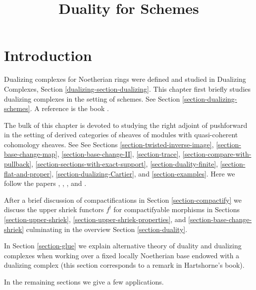 

%


\title{Duality for Schemes}


\maketitle

\label{section-phantom}

\tableofcontents

\section{Introduction}
\label{section-introduction}

\noindent
Dualizing complexes for Noetherian rings were defined and studied in
Dualizing Complexes, Section \ref{dualizing-section-dualizing}.
This chapter first briefly studies dualizing complexes in the
setting of schemes.
See Section \ref{section-dualizing-schemes}.
A reference is the book \cite{RD}.

\medskip\noindent
The bulk of this chapter is devoted to studying the right adjoint
of pushforward in the setting of derived categories of sheaves
of modules with quasi-coherent cohomology sheaves. See
See Sections
\ref{section-twisted-inverse-image},
\ref{section-base-change-map},
\ref{section-base-change-II},
\ref{section-trace},
\ref{section-compare-with-pullback},
\ref{section-sections-with-exact-support},
\ref{section-duality-finite},
\ref{section-flat-and-proper},
\ref{section-dualizing-Cartier}, and
\ref{section-examples}.
Here we follow the papers 
\cite{Neeman-Grothendieck}, \cite{LN},
\cite{Lipman-notes}, and \cite{Neeman-improvement}.

\medskip\noindent
After a brief discussion of compactifications in
Section \ref{section-compactify}
we discuss the upper shriek functors $f^!$ for
compactifyable morphisms in
Sections \ref{section-upper-shriek},
\ref{section-upper-shriek-properties}, and
\ref{section-base-change-shriek}
culminating in the overview Section
\ref{section-duality}.

\medskip\noindent
In Section \ref{section-glue}
we explain alternative theory of duality and dualizing
complexes when working over a fixed locally Noetherian
base endowed with a dualizing complex (this section corresponds
to a remark in Hartshorne's book).

\medskip\noindent
In the remaining sections we give a few applications.








